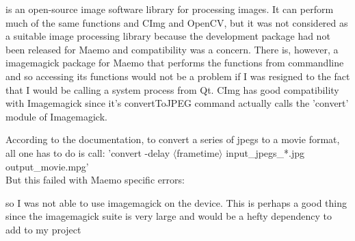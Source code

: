 \documentclass[11pt]{article} %
\begin{document}
{\hspace{-20pt}{\bf Imagemagick} is an open-source image software library for processing images. It can perform much of the same functions and CImg and OpenCV, but it was not considered as a suitable image processing library because the development package had not been released for Maemo and compatibility was a concern. There is, however, a imagemagick package for Maemo that performs the functions from commandline and so accessing its functions would not be a problem if I was resigned to the fact that I would be calling a system process from Qt. CImg has good compatibility with Imagemagick since it's convertToJPEG command actually calls the 'convert' module of Imagemagick.

According to the documentation, to convert a series of jpegs to a movie format, all one has to do is call:
'convert -delay \(\langle\)frametime\(\rangle\) input\_jpegs\_*.jpg output\_movie.mpg'\\
But this failed with Maemo specific errors:
\pagebreak
\vspace{-20pt}
\begin{frame}{}

\end{frame}
so I was not able to use imagemagick on the device. This is perhaps a good thing since the imagemagick suite is very large and would be a hefty dependency to add to my project\\

}
\end{document}
